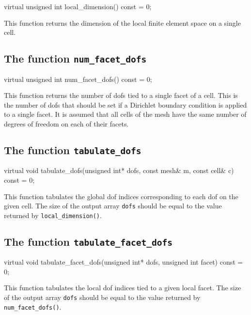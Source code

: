 \begin{code}
virtual unsigned int local_dimension() const = 0;
\end{code}

This function returns the dimension of the local finite element space
on a single cell.

\subsection{The function \texttt{num\_facet\_dofs}}

\begin{code}
virtual unsigned int num_facet_dofs() const = 0;
\end{code}

This function returns the number of dofs tied to a single facet of a
cell. This is the number of dofs that should be set if a Dirichlet
boundary condition is applied to a single facet. It is assumed that
all cells of the mesh have the same number of degrees of freedom on
each of their facets.

\subsection{The function \texttt{tabulate\_dofs}}

\begin{code}
virtual void tabulate_dofs(unsigned int* dofs,
                           const mesh& m,
                           const cell& c) const = 0;
\end{code}

This function tabulates the global dof indices corresponding to each
dof on the given cell. The size of the output array \texttt{dofs}
should be equal to the value returned by \texttt{local\_dimension()}.

\subsection{The function \texttt{tabulate\_facet\_dofs}}

\begin{code}
virtual void
tabulate_facet_dofs(unsigned int* dofs,
                    unsigned int facet) const = 0;
\end{code}

This function tabulates the local dof indices tied to a given local
facet. The size of the output array \texttt{dofs} should be equal to
the value returned by \texttt{num\_facet\_dofs()}.

